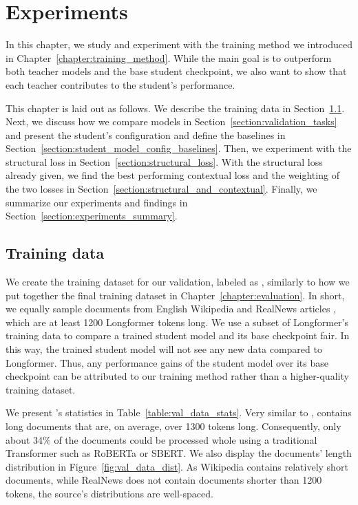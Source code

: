 \chapter{Experiments}\label{chapter:experiments}

In this chapter, we study and experiment with the training method we introduced
in Chapter~\ref{chapter:training_method}. While the main goal is to outperform
both teacher models and the base student checkpoint, we also want to show that
each teacher contributes to the student's performance.

This chapter is laid out as follows. We describe the training data in
Section~\ref{section:val_training_data}. Next, we discuss how we compare models
in Section~\ref{section:validation_tasks} and present the student's
configuration and define the baselines in
Section~\ref{section:student_model_config_baselines}. Then, we experiment with
the structural loss in Section~\ref{section:structural_loss}. With the
structural loss already given, we find the best performing contextual loss and
the weighting of the two losses in Section~\ref{section:structural_and_contextual}.
Finally, we summarize our experiments and findings in
Section~\ref{section:experiments_summary}.

\section{Training data}\label{section:val_training_data}

We create the training dataset for our validation, labeled as
, similarly to how we put together the final training
dataset  in Chapter~\ref{chapter:evaluation}. In short,
we equally sample documents from English Wikipedia and RealNews articles
\citep{zellers2019defending}, which are at least 1200 Longformer tokens long.
We use a subset of Longformer's training data to compare a
trained student model and its base checkpoint fair. In this way, the trained
student model will not see any new data compared to Longformer. Thus, any
performance gains of the student model over its base checkpoint can be
attributed to our training method rather than a higher-quality training
dataset.

We present 's statistics in
Table~\ref{table:val_data_stats}. Very similar to ,
 contains long documents that are, on average, over 1300 tokens long. Consequently, only about 34\% of the documents could be processed
whole using a traditional Transformer such as RoBERTa \citep{liu2019roberta} or
SBERT. We also display the documents' length distribution in
Figure~\ref{fig:val_data_dist}. As Wikipedia contains relatively short
documents, while RealNews does not contain documents shorter than 1200 tokens,
the source's distributions are well-spaced.


